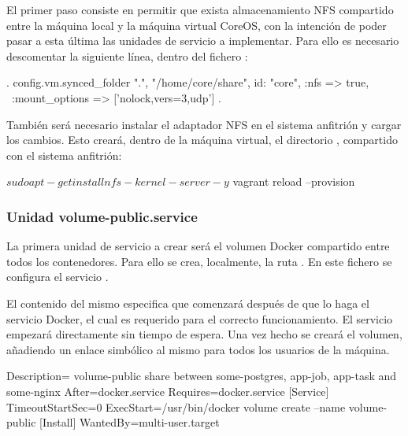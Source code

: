 El primer paso consiste en permitir que exista almacenamiento NFS compartido entre la máquina local y la máquina virtual CoreOS, con la intención de poder pasar a esta última las unidades de servicio a implementar. Para ello es necesario descomentar la siguiente línea, dentro del fichero :

\begin{codelisting}
\label{code:vagrantfile2}
\begin{code}
.
config.vm.synced_folder ".", "/home/core/share", id: "core", :nfs => true, \
:mount_options => ['nolock,vers=3,udp']
.
\end{code}
\end{codelisting}

También será necesario instalar el adaptador NFS en el sistema anfitrión y cargar los cambios. Esto creará, dentro de la máquina virtual, el directorio , compartido con el sistema anfitrión:

\begin{code}
$ sudo apt-get install nfs-kernel-server -y
$ vagrant reload --provision
\end{code}

\subsubsection{Unidad volume-public.service}

La primera unidad de servicio a crear será el volumen Docker compartido entre todos los contenedores. Para ello se crea, localmente, la ruta . En este fichero se configura el servicio . 

El contenido del mismo especifica que comenzará después de que lo haga el servicio Docker, el cual es requerido para el correcto funcionamiento. El servicio empezará directamente sin tiempo de espera. Una vez hecho se creará el volumen, añadiendo un enlace simbólico al mismo para todos los usuarios de la máquina. 

\begin{codelisting}
\label{code:volume-public.service}
\begin{code}
[Unit] 
  Description= volume-public share between some-postgres, app-job, app-task and 
               some-nginx 
  After=docker.service
  Requires=docker.service
[Service] 
  TimeoutStartSec=0 
  ExecStart=/usr/bin/docker volume create --name volume-public
[Install] 
  WantedBy=multi-user.target
\end{code}
\end{codelisting}

